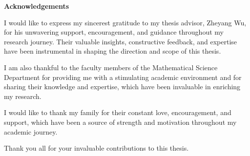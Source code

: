 \thispagestyle{empty}
\begin{center}
	\textbf{\Large{Acknowledgements}}
\end{center}



I would like to express my sincerest gratitude to my thesis advisor, Zheyang Wu, for his unwavering support, encouragement, and guidance throughout my research journey. Their valuable insights, constructive feedback, and expertise have been instrumental in shaping the direction and scope of this thesis.

I am also thankful to the faculty members of the Mathematical Science Department for providing me with a stimulating academic environment and for sharing their knowledge and expertise, which have been invaluable in enriching my research.

I would like to thank my family for their constant love, encouragement, and support, which have been a source of strength and motivation throughout my academic journey.

Thank you all for your invaluable contributions to this thesis.
\clearpage
